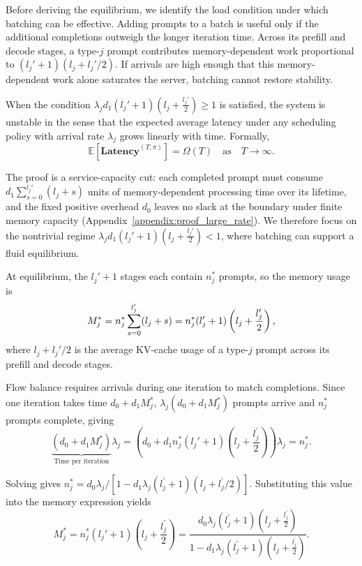 Before deriving the equilibrium, we identify the load condition under which batching can be effective. Adding prompts to a batch is useful only if the additional completions outweigh the longer iteration time. Across its prefill and decode stages, a type-\(j\) prompt contributes memory-dependent work proportional to \((l_j' + 1)(l_j + l_j'/2)\). If arrivals are high enough that this memory-dependent work alone saturates the server, batching cannot restore stability.

\begin{proposition}\label{prop:large_rate}
When the condition $\lambda_j d_1 (l_j' + 1) \left( l_j + \frac{l_j'}{2} \right) \geq 1$ is satisfied, the system is unstable in the sense that the expected average latency under any scheduling policy with arrival rate \( \lambda_j \) grows linearly with time. Formally,
$$
\mathbb{E}[\textbf{Latency}^{(T,\pi)}] = \Omega(T) \quad \text{as} \quad T \to \infty.
$$
\end{proposition}

The proof is a service-capacity cut: each completed prompt must consume \(d_1\sum_{s=0}^{l_j'}(l_j+s)\) units of memory-dependent processing time over its lifetime, and the fixed positive overhead \(d_0\) leaves no slack at the boundary under finite memory capacity (Appendix~\ref{appendix:proof_large_rate}). We therefore focus on the nontrivial regime $\lambda_j d_1 (l_j' + 1) \left( l_j + \frac{l_j'}{2} \right) <1$, where batching can support a fluid equilibrium.

At equilibrium, the \(l_j'+1\) stages each contain \(n_j^*\) prompts, so the memory usage is
\begin{equation}
    M_j^* = n_j^* \sum_{s=0}^{l_j^{\prime}}(l_j+s) = n_j^*(l_j'+1)\left({l_j+\frac{l_j'}{2}}\right),
\end{equation}
where \(l_j+l_j'/2\) is the average KV-cache usage of a type-\(j\) prompt across its prefill and decode stages.

Flow balance requires arrivals during one iteration to match completions. Since one iteration takes time \(d_0+d_1M_j^*\), \(\lambda_j(d_0+d_1M_j^*)\) prompts arrive and \(n_j^*\) prompts complete, giving
\begin{equation}
\label{eq:single_type_equilibrium}
\underset{\text{Time per iteration}}{\underbrace{(d_0+d_1M_j^{*} )}}\lambda_j =\left(d_0+d_1 n_j^*(l_j'+1)\left( l_j +\frac{l_j^{\prime}}{2} \right) \right)\lambda_j= n_j^*.
\end{equation}

Solving gives \(n_j^* = d_0\lambda_j/[1-d_1\lambda_j(l_j^{\prime}+1)(l_j+l_j^{\prime}/2)]\). Substituting this value into the memory expression yields
\begin{equation}
    \label{eq:memory_single}
M_j^* = n_j^*(l_j'+1)\left( l_j+\frac{l_j^{\prime}}{2} \right)
=  \frac{d_0\lambda_j(l_j^{\prime}+1)\left( l_j+\frac{l_j^{\prime}}{2} \right) }{1-d_1\lambda_j(l_j^{\prime}+1)(l_j+\frac{l_j^{\prime}}{2})}.
\end{equation}

